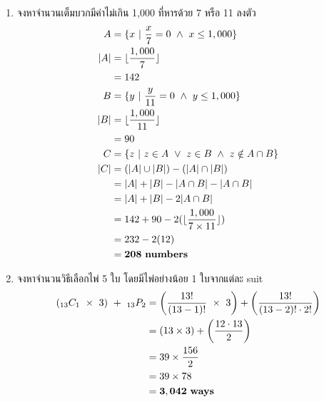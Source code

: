 \documentclass{article}
\begin{document}
\begin{enumerate}
	\item จงหาจำนวนเต็มบวกมีค่าไม่เกิน 1,000 ที่หารด้วย 7 หรือ 11 ลงตัว
	\begin{equation}
	\begin{split}
	A &= \{x ~|~ \frac{x}{7} = 0 ~\wedge~ x \leq 1,000 \} \notag \\
	|A| &= \lfloor \frac{1,000}{7} \rfloor \\
	&= 142 \\
	B &= \{y ~|~ \frac{y}{11} = 0 ~\wedge~ y \leq 1,000 \} \\
	|B| &= \lfloor \frac{1,000}{11} \rfloor \\
	&= 90 \\
	C &= \{z ~|~ z \in A ~\vee~ z \in B ~\wedge~ z \notin A \cap B\} \\
	|C| &= (|A| \cup |B|) - (|A| \cap |B|) \\
	&= |A| + |B| - |A \cap B| - |A \cap B| \\
	&= |A| + |B| - 2|A \cap B| \\
	&= 142 + 90 - 2(\lfloor \frac{1,000}{7 \times 11} \rfloor) \\
	&= 232 - 2(12) \\
	&= \mathbf{208~numbers}
	\end{split}
	\end{equation}
	
	\item จงหาจำนวนวิธีเลือกไพ่ 5 ใบ โดยมีไพ่อย่างน้อย 1 ใบจากแต่ละ suit
	\begin{equation}
	\begin{split}
	(_{13}C_1 ~\times~ 3) ~+~ _{13}P_2 &= \left( \frac{13!}{(13 - 1)!} ~\times~ 3 \right) + \left( \frac{13!}{(13 - 2)! \cdot 2!} \right) \notag \\
	&= (13 \times 3) + \left( \frac{12 \cdot 13 }{2} \right) \\
	&= 39 \times \frac{156}{2} \\
	&= 39 \times 78 \\
	&= \mathbf{3,042~ways}
	\end{split}
	\end{equation}
	
\pagebreak
	

\end{enumerate}
\end{document}
